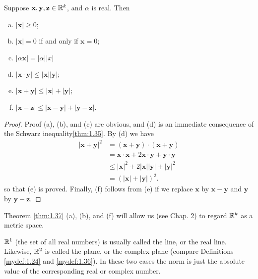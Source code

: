 \begin{thm}\label{thm:1.37}
    Suppose $\mathbf{x}, \mathbf{y}, \mathbf{z}\in{\protect\mathbb R}^k$, and $\alpha$ is real. Then
    \begin{enumerate}[(a)]
        \item $| \mathbf{x}| \geq 0$;
        \item $| \mathbf{x}| = 0$ if and only if $\mathbf{x} =0$;
        \item $| \alpha \mathbf{x}| = | \alpha||x|$
        \item $|\mathbf{x}\cdot\mathbf{y}| \leq  |\mathbf{x}| | \mathbf{y}|$;
        \item $|\mathbf{x}+\mathbf{y}| \leq | \mathbf{x} | + | \mathbf{y}|$;
        \item $|\mathbf{x}-\mathbf{z}| \leq |\mathbf{x}-\mathbf{y}| + |\mathbf{y}-\mathbf{z}|$.
    \end{enumerate}
\end{thm}


\begin{proof}
    Proof (a), (b), and (c) are obvious, and (d) is an immediate consequence of the Schwarz inequality\ref{thm:1.35}. 
    By (d) we have 
    \begin{align*}
        |\mathbf{x} + \mathbf{y}|^2
        &= (\mathbf{x} + \mathbf{y}) \cdot (\mathbf{x} + \mathbf{y})\\
        &= \mathbf{x} \cdot \mathbf{x} + 2\mathbf{x} \cdot \mathbf{y} + \mathbf{y} \cdot \mathbf{y}\\
        &\leq |\mathbf{x}|^2 + 2|\mathbf{x}||\mathbf{y}| + |\mathbf{y}|^2\\
        &= \left(|\mathbf{x}| + |\mathbf{y}|\right)^2.
    \end{align*}
    so that (e) is proved. Finally, 
    (f) follows from (e) if we 
    replace $\mathbf{x}$ by $\mathbf{x}-\mathbf{y}$ 
    and $\mathbf{y}$ by $\mathbf{y}-\mathbf{z}$.
\end{proof}

\begin{myremark}
    \label{myremark:1.38}
    Theorem \ref{thm:1.37} (a), (b), and (f) will allow us (see Chap. 2) to
    regard ${\protect\mathbb R}^k$ as a metric space.
    
    ${\protect\mathbb R}^1$ (the set of all real numbers) is usually called the line, 
    or the real line. 
    Likewise, ${\protect\mathbb R}^2$ is called the plane, or the complex plane (compare Definitions \ref{mydef:1.24} and \ref{mydef:1.36}). 
    In these two cases the norm is just the absolute value of the corresponding real or complex number. 
\end{myremark}
